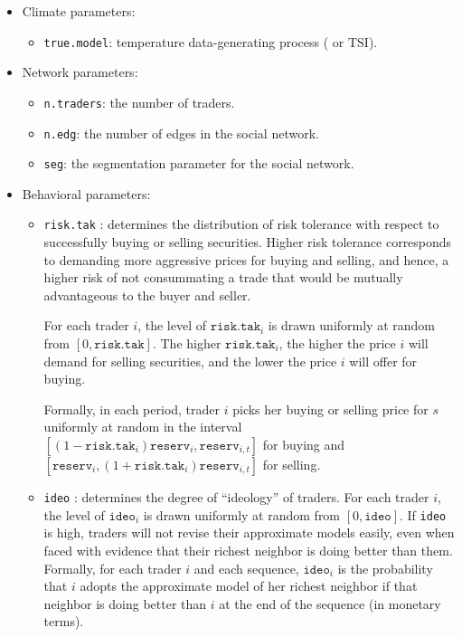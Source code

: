 \documentclass{wscpaperproc}\usepackage[]{graphicx}\usepackage[]{color}
\begin{document}
\begin{itemize}
  \item Climate parameters:
  \begin{itemize}
    \item  \texttt{true.model}: temperature data-generating process ( or TSI).
  \end{itemize}

  \item Network parameters:
  \begin{itemize}
    \item  \texttt{n.traders}: the number of traders.
    \item  \texttt{n.edg}: the number of edges in the social network.
    \item  \texttt{seg}: the segmentation parameter for the social network.
  \end{itemize}

  \item Behavioral parameters:
  \begin{itemize}
    \item  \texttt{risk.tak} : determines the distribution of risk tolerance with respect to successfully buying or selling securities.     Higher risk tolerance corresponds to demanding more aggressive prices for buying and selling, and hence, a higher risk of not consummating a trade that would be mutually advantageous to the buyer and seller.

    For each trader $i$, the level of $\texttt{risk.tak}_i$ is drawn uniformly at random from $[0,\texttt{risk.tak}]$.
    The higher $\texttt{risk.tak}_i$, the higher the price $i$ will demand for selling securities, and the lower the price $i$ will offer for buying.

    Formally, in each period, trader $i$ picks her buying or selling price for $s$ uniformly at random in the interval
    $[(1 - \texttt{risk.tak}_i) \texttt{reserv}_{i}, \allowbreak  \texttt{reserv}_{i,t}]$ for buying and
    $[\texttt{reserv}_{i}, \allowbreak (1  + \texttt{risk.tak}_i) \texttt{reserv}_{i,t}]$ for selling.

  \item  \texttt{ideo} :  determines the degree of ``ideology'' of traders.
    For each trader $i$, the level of $\texttt{ideo}_i$ is drawn uniformly at random from $[0,\texttt{ideo}]$.
    If \texttt{ideo} is high, traders will not revise their approximate models easily, even when faced with evidence that their richest neighbor is doing better than them.
    Formally, for each trader $i$ and each sequence, $\texttt{ideo}_i$ is the probability that $i$ adopts the approximate model of her richest neighbor if that neighbor is doing better than $i$ at the end of the sequence (in monetary terms).
  \end{itemize}
\end{itemize}
\end{document}
